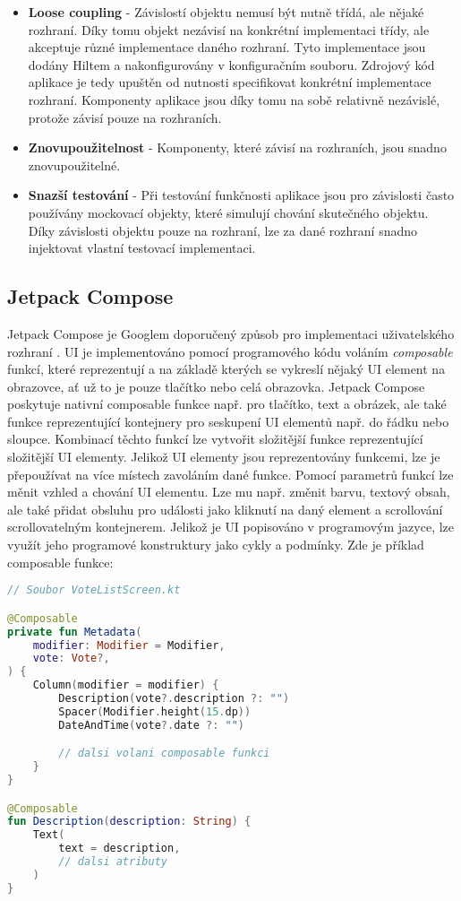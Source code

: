 \begin{itemize}
	\item \textbf{Loose coupling} - Závislostí objektu nemusí být nutně třídá, ale nějaké rozhraní. Díky tomu objekt nezávisí na konkrétní implementaci třídy, ale akceptuje různé implementace daného rozhraní. Tyto implementace jsou dodány Hiltem a nakonfigurovány v konfiguračním souboru. Zdrojový kód aplikace je tedy upuštěn od nutnosti specifikovat konkrétní implementace rozhraní. Komponenty aplikace jsou díky tomu na sobě relativně nezávislé, protože závisí pouze na rozhraních. 
	
	\item \textbf{Znovupoužitelnost} - Komponenty, které závisí na rozhraních, jsou snadno znovupoužitelné.
	
	\item \textbf{Snazší testování} - Při testování funkčnosti aplikace jsou pro závislosti často používány mockovací objekty, které simulují chování skutečného objektu. Díky závislosti objektu pouze na rozhraní, lze za dané rozhraní snadno injektovat vlastní testovací implementaci. 
\end{itemize}

\subsection*{Jetpack Compose}
\label{ssec:jetpack-compose}
Jetpack Compose je Googlem doporučený způsob pro implementaci uživatelského rozhraní \cite{jetpack-compose}. UI je implementováno pomocí programového kódu voláním \textit{composable} funkcí, které reprezentují a na základě kterých se vykreslí nějaký UI element na obrazovce, ať už to je pouze tlačítko nebo celá obrazovka. Jetpack Compose poskytuje nativní composable funkce např. pro tlačítko, text a obrázek, ale také funkce reprezentující kontejnery pro seskupení UI elementů např. do řádku nebo sloupce. Kombinací těchto funkcí lze vytvořit složitější funkce reprezentující složitější UI elementy. Jelikož UI elementy jsou reprezentovány funkcemi, lze je přepoužívat na více místech zavoláním dané funkce. Pomocí parametrů funkcí lze měnit vzhled a chování UI elementu. Lze mu např. změnit barvu, textový obsah, ale také přidat obsluhu pro události jako kliknutí na daný element a scrollování scrollovatelným kontejnerem. Jelikož je UI popisováno v programovým jazyce, lze využít jeho programové konstruktury jako cykly a podmínky. Zde je příklad composable funkce:

\begin{lstlisting}[caption={Ukázka composable funkce}, label={lst:composable-example}, tabsize=2, language=Kotlin]
// Soubor VoteListScreen.kt

@Composable
private fun Metadata(
	modifier: Modifier = Modifier,
	vote: Vote?,
) {
	Column(modifier = modifier) {
		Description(vote?.description ?: "")
		Spacer(Modifier.height(15.dp))
		DateAndTime(vote?.date ?: "")

		// dalsi volani composable funkci
	}
}

@Composable
fun Description(description: String) {
	Text(
		text = description,
		// dalsi atributy
	)
}

\end{lstlisting}

